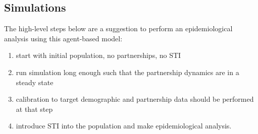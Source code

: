 \documentclass[11pt, onecolumn]{article}
\begin{document}
\subsection{Simulations}

The high-level steps below are a suggestion to perform an epidemiological analysis using this agent-based model:

\begin{enumerate}
\item start with initial population, no partnerships, no STI
\item run simulation long enough such that the partnership dynamics are in a steady state
\item calibration to target demographic and partnership data should be performed at that step
\item introduce STI into the population and make epidemiological analysis.
\end{enumerate}


\newpage


\end{document}

